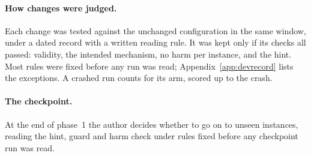 \paragraph{How changes were judged.} Each change was tested against the unchanged configuration in the same window,
under a dated record with a written reading rule. It was kept only if its checks all passed: validity, the intended
mechanism, no harm per instance, and the hint. Most rules were fixed before any run was read; Appendix~\ref{app:devrecord} lists the
exceptions. A crashed run counts for its arm, scored up to the crash.

\paragraph{The checkpoint.} At the end of phase~1 the author decides whether to go on to unseen instances, reading the
hint, guard and harm check under rules fixed before any checkpoint run was read.
\FloatBarrier
